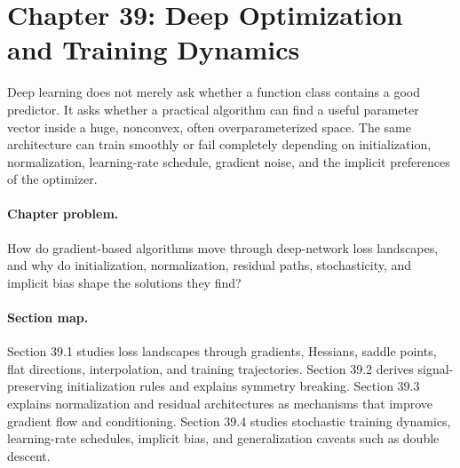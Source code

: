 \section{Chapter 39: Deep Optimization and Training Dynamics}
\label{ch:deep-optimization-training-dynamics}

Deep learning does not merely ask whether a function class contains a good predictor. It asks whether a practical algorithm can find a useful parameter vector inside a huge, nonconvex, often overparameterized space. The same architecture can train smoothly or fail completely depending on initialization, normalization, learning-rate schedule, gradient noise, and the implicit preferences of the optimizer.

\paragraph{Chapter problem.}
How do gradient-based algorithms move through deep-network loss landscapes, and why do initialization, normalization, residual paths, stochasticity, and implicit bias shape the solutions they find?

\paragraph{Section map.}
Section 39.1 studies loss landscapes through gradients, Hessians, saddle points, flat directions, interpolation, and training trajectories. Section 39.2 derives signal-preserving initialization rules and explains symmetry breaking. Section 39.3 explains normalization and residual architectures as mechanisms that improve gradient flow and conditioning. Section 39.4 studies stochastic training dynamics, learning-rate schedules, implicit bias, and generalization caveats such as double descent.

